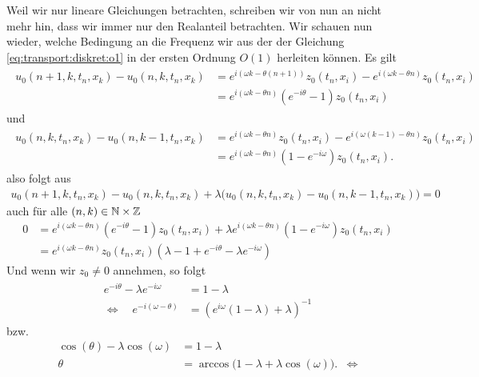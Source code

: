 Weil wir nur lineare Gleichungen betrachten, schreiben wir von nun an nicht mehr hin, dass wir immer nur den Realanteil betrachten.
Wir schauen nun wieder, welche Bedingung an die Frequenz wir aus der der Gleichung \eqref{eq:transport:diskret:o1} in der ersten Ordnung $O(1)$ herleiten können.
Es gilt
\begin{align}\begin{split}
u_0(n+1,k,t_n,x_k) - u_0(n,k,t_n,x_k) &= e^{i (\omega k - \theta (n+1))} z_0(t_n,x_i) - e^{i (\omega k - \theta n)} z_0(t_n,x_i) \\
&= e^{i (\omega k - \theta n)} \left(e^{-i\theta} - 1 \right) z_0(t_n,x_i)
\end{split}\end{align}
und
\begin{align}\begin{split}
u_0(n,k,t_n,x_k) - u_0(n,k-1,t_n,x_k) &= e^{i (\omega k - \theta n)} z_0(t_n,x_i) - e^{i (\omega (k-1) - \theta n)} z_0(t_n,x_i)\\
&= e^{i (\omega k - \theta n)} (1 - e^{-i \omega}) z_0(t_n,x_i).
\end{split}\end{align}
also folgt aus
\begin{align*}
u_0(n+1,k,t_n,x_k) - u_0(n,k,t_n,x_k) + \lambda \bigl(u_0(n,k,t_n,x_k) - u_0(n,k-1,t_n,x_k) \bigr) = 0
\end{align*}
auch für alle $(n, k) \in \mathbb N \times \mathbb Z$
\begin{align}
0 &= e^{i (\omega k - \theta n)} (e^{-i\theta} - 1) z_0(t_n,x_i) + \lambda e^{i (\omega k - \theta n)} (1 - e^{-i \omega}) z_0(t_n,x_i)\\
&= e^{i (\omega k - \theta n)} z_0(t_n,x_i) ( \lambda - 1 + e^{-i\theta} - \lambda e^{-i \omega} )
\end{align}
Und wenn wir $z_0 \neq 0$ annehmen, so folgt
\begin{align}\label{eq:wkb:gl1}
\begin{split}
e^{-i \theta} - \lambda e^{-i \omega} &= 1 - \lambda\\
\Leftrightarrow \quad e^{-i (\omega - \theta)} &= \left( e^{i \omega} (1 -  \lambda) + \lambda \right)^{-1}
\end{split}
\end{align}
bzw.
\begin{align*}
\cos(\theta) - \lambda \cos(\omega) &= 1 - \lambda\\
\theta  &=  \arccos\bigl(1 - \lambda + \lambda \cos(\omega) \bigr). &\Leftrightarrow
\end{align*}

